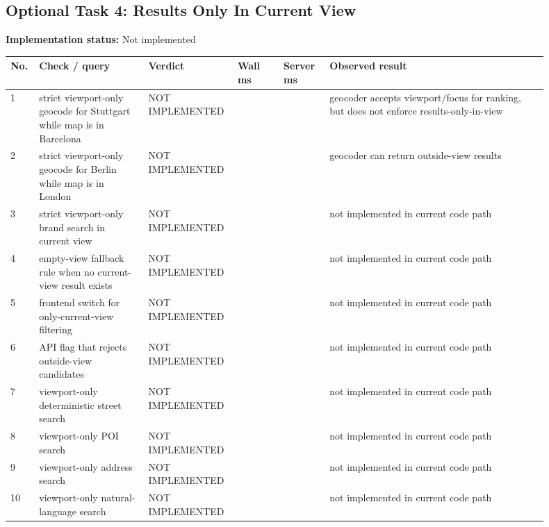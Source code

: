 \documentclass[10pt,a4paper]{article}
\begin{document}
\subsection{Optional Task 4: Results Only In Current View}
\textbf{Implementation status:} Not implemented\\
\scriptsize
\begin{longtable}{|P{0.045\linewidth}|P{0.19\linewidth}|P{0.105\linewidth}|P{0.085\linewidth}|P{0.085\linewidth}|P{0.385\linewidth}|}
\hline
\textbf{No.} & \textbf{Check / query} & \textbf{Verdict} & \textbf{Wall ms} & \textbf{Server ms} & \textbf{Observed result}\\ \hline
{} 1 & strict viewport-only geocode for Stuttgart while map is in Barcelona & NOT IMPLEMENTED &  &  & geocoder accepts viewport/focus for ranking, but does not enforce results-only-in-view\\ \hline
{} 2 & strict viewport-only geocode for Berlin while map is in London & NOT IMPLEMENTED &  &  & geocoder can return outside-view results\\ \hline
{} 3 & strict viewport-only brand search in current view & NOT IMPLEMENTED &  &  & not implemented in current code path\\ \hline
{} 4 & empty-view fallback rule when no current-view result exists & NOT IMPLEMENTED &  &  & not implemented in current code path\\ \hline
{} 5 & frontend switch for only-current-view filtering & NOT IMPLEMENTED &  &  & not implemented in current code path\\ \hline
{} 6 & API flag that rejects outside-view candidates & NOT IMPLEMENTED &  &  & not implemented in current code path\\ \hline
{} 7 & viewport-only deterministic street search & NOT IMPLEMENTED &  &  & not implemented in current code path\\ \hline
{} 8 & viewport-only POI search & NOT IMPLEMENTED &  &  & not implemented in current code path\\ \hline
{} 9 & viewport-only address search & NOT IMPLEMENTED &  &  & not implemented in current code path\\ \hline
{} 10 & viewport-only natural-language search & NOT IMPLEMENTED &  &  & not implemented in current code path\\ \hline
\end{longtable}
\normalsize
\end{document}
